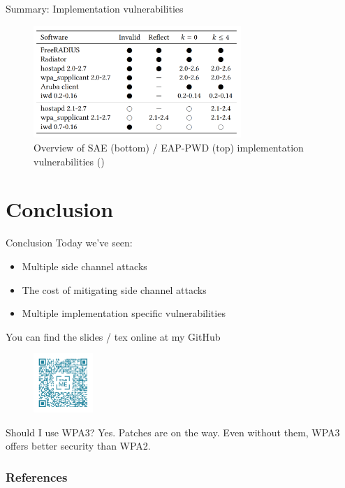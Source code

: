 \documentclass[xcolor=table]{bredelebeamer}
\begin{document}
\begin{frame}{Summary: Implementation vulnerabilities}
    \begin{figure}
        \centering
        \includegraphics[width=0.7\textwidth]{summary.png}
        \caption{Overview of SAE (bottom) / EAP-PWD (top) implementation vulnerabilities (\cite{vanhoef-sp2020-dragonblood})}
        \label{fig:my_label}
    \end{figure}
\end{frame}
\section{Conclusion}
\begin{frame}{Conclusion}
    Today we've seen:

\begin{itemize}
    \item Multiple side channel attacks
    \item The cost of mitigating side channel attacks
    \item Multiple implementation specific vulnerabilities
\end{itemize}
You can find the slides / tex online at my GitHub
\begin{figure}[H]
    \centering
    \includegraphics[width=0.2\textwidth]{frame.png}
    \label{fig:my_label}
\end{figure}
 \begin{exampleblock}{Should I use WPA3?}
 Yes. Patches are on the way. Even without them, WPA3 offers better security than WPA2.
 \end{exampleblock}
\end{frame}
\begin{frame}[allowframebreaks]
        \frametitle{References}
        \printbibliography
\end{frame}
\end{document}

